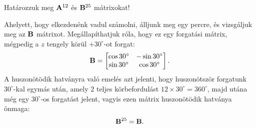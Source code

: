 \begin{exercise}{Határozzuk meg $\mathbf{A}^{12}$ és $\mathbf{B}^{25}$ mátrixokat!}
{  \tcbline

  Ahelyett, hogy elkezdenénk vadul számolni, álljunk meg egy percre, és
  vizsgáljuk meg az $\mathbf{B}$ mátrixot. Megállapíthatjuk róla, hogy ez egy
  forgatási mátrix, mégpedig a $z$ tengely körül $+30^\circ$-ot forgat:
  \[
    \mathbf{B} = \begin{bmatrix}
      \cos 30^\circ & - \sin 30^\circ \\
      \sin 30^\circ & \cos 30^\circ
    \end{bmatrix}
    \text.
  \]
  A huszonötödik hatványra való emelés azt jelenti, hogy huszonötször forgatunk
  $30^\circ$-kal egymás után, amely 2 teljes körbefordulást $12 \times
    30^\circ = 360^\circ$, majd utána még egy $30^\circ$-os forgatást jelent,
  vagyis ezen mátrix huszonötödik hatványa önmaga:
  \[
    \mathbf{B}^{25} = \mathbf{B}
    \text.
  \]
  }
\end{exercise}
